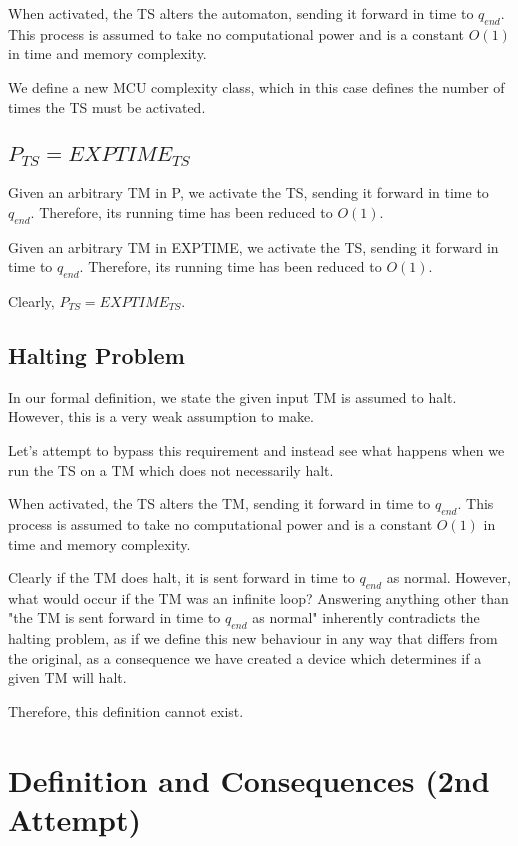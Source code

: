 \documentclass{report}
\begin{document}
When activated, the TS alters the automaton, sending it forward in time to $q_{end}$. This process is assumed to take no computational power and is a constant $O(1)$ in time and memory complexity.

We define a new MCU complexity class, which in this case defines the number of times the TS must be activated.

\subsection{$P_{TS} = EXPTIME_{TS}$}

Given an arbitrary TM in P, we activate the TS, sending it forward in time to $q_{end}$. Therefore, its running time has been reduced to $O(1)$.

Given an arbitrary TM in EXPTIME, we activate the TS, sending it forward in time to $q_{end}$. Therefore, its running time has been reduced to $O(1)$.

Clearly, $P_{TS} = EXPTIME_{TS}$.

\subsection{Halting Problem}

In our formal definition, we state the given input TM is assumed to halt. However, this is a very weak assumption to make.

Let's attempt to bypass this requirement and instead see what happens when we run the TS on a TM which does not necessarily halt.

When activated, the TS alters the TM, sending it forward in time to $q_{end}$. This process is assumed to take no computational power and is a constant $O(1)$ in time and memory complexity.

Clearly if the TM does halt, it is sent forward in time to $q_{end}$ as normal. However, what would occur if the TM was an infinite loop? Answering anything other than "the TM is sent forward in time to $q_{end}$ as normal" inherently contradicts the halting problem, as if we define this new behaviour in any way that differs from the original, as a consequence we have created a device which determines if a given TM will halt.

Therefore, this definition cannot exist.

\newpage
\section {Definition and Consequences (2nd Attempt)}
\end{document}
